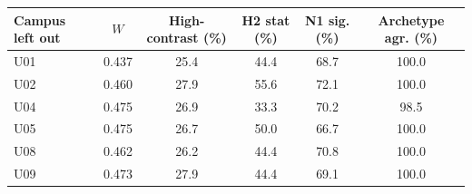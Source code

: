 \begin{tabular}{lccccc}
\toprule
Campus left out & $W$ & High-contrast (\%) & H2 stat (\%) & N1 sig. (\%) & Archetype agr. (\%) \\
\midrule
U01 & 0.437 & 25.4 & 44.4 & 68.7 & 100.0 \\
U02 & 0.460 & 27.9 & 55.6 & 72.1 & 100.0 \\
U04 & 0.475 & 26.9 & 33.3 & 70.2 & 98.5 \\
U05 & 0.475 & 26.7 & 50.0 & 66.7 & 100.0 \\
U08 & 0.462 & 26.2 & 44.4 & 70.8 & 100.0 \\
U09 & 0.473 & 27.9 & 44.4 & 69.1 & 100.0 \\
\bottomrule
\end{tabular}
